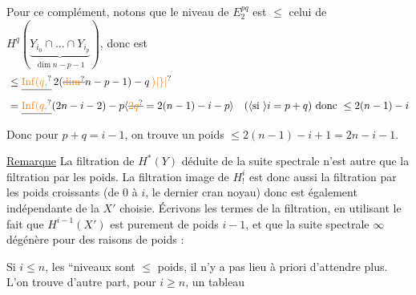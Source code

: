 Pour ce complément, notons que le niveau de $E^{pq}_2$ est $\le$ celui de $H^q(\underbrace{Y_{i_0}\cap\ldots\cap Y_{i_p}}_{\dim n-p-1})$, donc est
\[
\begin{aligned}
 {}\le{}&\deleted{\unsure{\operatorname{Inf}(q,}}\,2(\deleted{\unsure{\dim}}n-p-1)-q\,\unsure{\bigr)|\}|{}}\\
 ={}&\deleted{\unsure{\operatorname{Inf}(q,}}(2n-i-2)-p
 \inserted{\deleted{\unsure{2q}}=2(n-1)-i-p}
 \quad(\inserted{\text{si }}i=p+q)\ \text{donc }\le 2(n-1)-i
\end{aligned}
\]
Donc  pour $p+q=i-1$, on trouve un poids $\le 2(n-1)-i+1=2n-i-1$.

\uline{Remarque} \quad La filtration de $H^*(Y)$ déduite de la suite spectrale  n'est autre que la filtration par les poids. La filtration image de $H^i_!$ est donc aussi la filtration par les poids croissants (de $0$ à $i$, le dernier cran  noyau) donc est également indépendante de la  $X'$ choisie. Écrivons les termes de la filtration, en utilisant le fait que $H^{i-1}(X')$ est purement de poids $i-1$, et  que la suite spectrale $\infty$ dégénère pour des raisons de poids :


 Si $i\le n$, les \textquotedblleft{}niveaux sont  $\le$ poids, il n'y a pas lieu à priori d'attendre plus. L'on trouve d'autre part, pour $i\ge n$, un tableau


